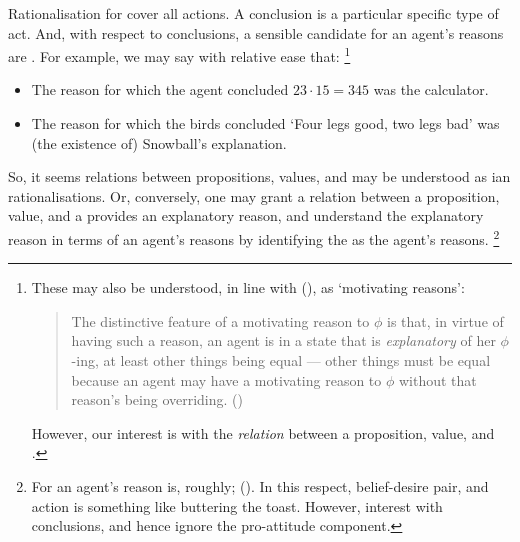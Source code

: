 \begin{note}
  Rationalisation for \citeauthor{Davidson:1963aa} cover all actions.
  A conclusion is a particular specific type of act.%
  And, with respect to conclusions, a sensible candidate for an agent's reasons are .
  For example, we may say with relative ease that:%
  \footnote{
    These may also be understood, in line with \citeauthor{Smith:1994wo} (\citeyear{Smith:1994wo}), as `motivating reasons':
    \begin{quote}
      The distinctive feature of a motivating reason to \(\phi\) is that, in virtue of having such a reason, an agent is in a state that is \emph{explanatory} of her \(\phi\)-ing, at least other things being equal --- other things must be equal because an agent may have a motivating reason to \(\phi\) without that reason's being overriding.\newline
      \mbox{}\hfill\mbox{(\citeyear[96]{Smith:1994wo})}
    \end{quote}
    However, our interest is with the \emph{relation} between a proposition, value, and \pool{}.
  }

  \begin{itemize}[noitemsep]
  \item
    The reason for which the agent concluded \(23 \cdot 15 = 345\) was the calculator.
  \item
    The reason for which the birds concluded `Four legs good, two legs bad' was (the existence of) Snowball's explanation.
  \end{itemize}

  So, it seems relations between propositions, values, and  may be understood as \citeauthor{Davidson:1963aa}ian rationalisations.
  Or, conversely, one may grant a relation between a proposition, value, and a  provides an explanatory reason, and understand the explanatory reason in terms of an agent's reasons by identifying the  as the agent's reasons.%
  \footnote{
    For \citeauthor{Davidson:1963aa} an agent's reason is, roughly;  (\citeyear[685]{Davidson:1963aa}).
  In this respect, belief-desire pair, and action is something like buttering the toast.
  However, interest with conclusions, and hence ignore the pro-attitude component.
}
\end{note}

